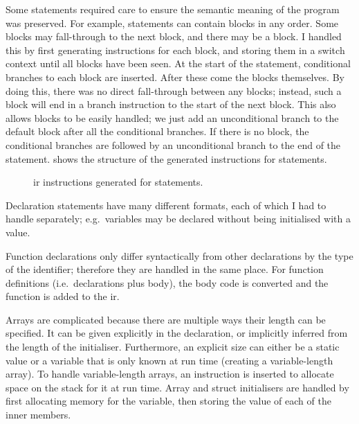 \documentclass[00-main.tex]{subfiles}
\begin{document}
Some statements required care to ensure the semantic meaning of the program was preserved.
For example,  statements can contain  blocks in any order.
Some blocks may fall-through to the next block, and there may be a  block.
I handled this by first generating instructions for each  block, and storing them in a switch context until all blocks have been seen.
At the start of the  statement, conditional branches to each  block are inserted.
After these come the blocks themselves.
By doing this, there was no direct fall-through between any blocks; instead, such a block will end in a branch instruction to the start of the next block.
This also allows  blocks to be easily handled; we just add an unconditional branch to the default block after all the conditional branches.
If there is no  block, the conditional branches are followed by an unconditional branch to the end of the  statement.
 shows the structure of the generated instructions for  statements.

\begin{figure}[t]
  \centering
  \caption{\gls{ir} instructions generated for  statements.}
  \label{fig:instr structure for switch statements} %
\end{figure}

Declaration statements have many different formats, each of which I had to handle separately; e.g.~variables may be declared without being initialised with a value.

Function declarations only differ syntactically from other declarations by the type of the identifier; therefore they are handled in the same place.
For function definitions (i.e.~declarations plus body), the body code is converted and the function is added to the \gls{ir}.

Arrays are complicated because there are multiple ways their length can be specified.
It can be given explicitly in the declaration, or implicitly inferred from the length of the initialiser.
Furthermore, an explicit size can either be a static value or a variable that is only known at run time (creating a variable-length array).
To handle variable-length arrays, an instruction is inserted to allocate space on the stack for it at run time.
Array and struct initialisers are handled by first allocating memory for the variable, then storing the value of each of the inner members.
\end{document}
